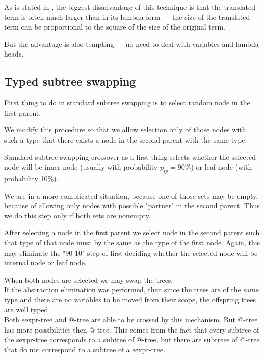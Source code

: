 \documentclass[conference]{IEEEtran}
\makeatletter
\newcommand{\atTree}{@-tree\xspace}
\newcommand{\sexprTree}{sexpr-tree\xspace}
\makeatother
\begin{document}
As is stated in \cite{jones87},
the biggest disadvantage of this technique is that the translated
term is often much larger than in its lambda form --- the size of
the translated term can be proportional to the
square of the size of the original term. 

But the advantage is also tempting --- no need to deal with variables
and lambda heads.

\subsection{Typed subtree swapping}
\label{typed-swapping}

First thing to do in standard subtree swapping is to select random node
in the first parent. 

We modify this procedure so that we allow
selection only of those nodes with such a type that there exists  
a node in the second parent with the same type.

Standard subtree swapping crossover as a first thing selects 
whether the selected node will be inner node (usually with probability 
$p_{ip} = 90\%$) or leaf node (with probability 10\%).

We are in a more complicated situation, because one of those 
sets may be empty, because of allowing only nodes with possible "partner"
in the second parent. Thus we do this step only if both sets are
nonempty. 

After selecting a node in the first parent we select node in the
second parent such that type of that node must by the same as the type 
of the first node. Again, this may eliminate the "90-10" step of
first deciding whether the selected node will be internal node 
or leaf node.

When both nodes are selected we may swap the trees. \\

If the abstraction elimination was performed, then 
since the trees are of the same type and there are no variables to be 
moved from their scope, the offspring trees are well typed.\\


Both \sexprTree and \atTree are able to be crossed by this 
mechanism. But \atTree has more possibilities then \atTree.
This comes from the fact that every subtree of the \sexprTree
corresponds to a subtree of \atTree, but there are subtrees
of \atTree that do not correspond to a subtree of a \sexprTree.\\
\end{document}
